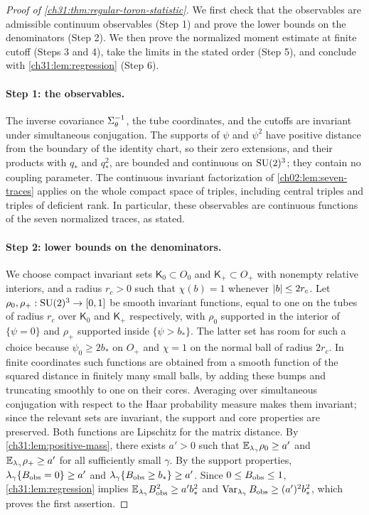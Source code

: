 \begin{proof}[Proof of \cref{ch31:thm:regular-toron-statistic}]
We first check that the observables are admissible continuum observables (Step 1) and prove the lower bounds on the denominators (Step 2). We then prove the normalized moment estimate at finite cutoff (Steps 3 and 4), take the limits in the stated order (Step 5), and conclude with \cref{ch31:lem:regression} (Step 6).

\paragraph{Step 1: the observables.}
The inverse covariance $\Sigma_\theta^{-1}$, the tube coordinates, and the cutoffs are invariant under simultaneous conjugation. The supports of $\psi$ and $\psi^2$ have positive distance from the boundary of the identity chart, so their zero extensions, and their products with $q_*$ and $q_*^2$, are bounded and continuous on $\mathrm{SU}(2)^3$; they contain no coupling parameter. The continuous invariant factorization of \cref{ch02:lem:seven-traces} applies on the whole compact space of triples, including central triples and triples of deficient rank. In particular, these observables are continuous functions of the seven normalized traces, as stated.

\paragraph{Step 2: lower bounds on the denominators.}
We choose compact invariant sets $\mathsf K_0\subset O_0$ and $\mathsf K_+\subset O_+$ with nonempty relative interiors, and a radius $r_c>0$ such that $\chi(b)=1$ whenever $\lvert b\rvert\le2r_c$. Let $\rho_0,\rho_+:\mathrm{SU}(2)^3\to[0,1]$ be smooth invariant functions, equal to one on the tubes of radius $r_c$ over $\mathsf K_0$ and $\mathsf K_+$ respectively, with $\rho_0$ supported in the interior of $\{\psi=0\}$ and $\rho_+$ supported inside $\{\psi>b_*\}$. The latter set has room for such a choice because $\psi_0\ge2b_*$ on $O_+$ and $\chi=1$ on the normal ball of radius $2r_c$. In finite coordinates such functions are obtained from a smooth function of the squared distance in finitely many small balls, by adding these bumps and truncating smoothly to one on their cores. Averaging over simultaneous conjugation with respect to the Haar probability measure makes them invariant; since the relevant sets are invariant, the support and core properties are preserved. Both functions are Lipschitz for the matrix distance. By \cref{ch31:lem:positive-mass}, there exists $a'>0$ such that $\mathbb E_{\lambda_\gamma}\rho_0\ge a'$ and $\mathbb E_{\lambda_\gamma}\rho_+\ge a'$ for all sufficiently small $\gamma$. By the support properties, $\lambda_\gamma\{B_{\mathrm{obs}}=0\}\ge a'$ and $\lambda_\gamma\{B_{\mathrm{obs}}\ge b_*\}\ge a'$. Since $0\le B_{\mathrm{obs}}\le1$, \cref{ch31:lem:regression} implies $\mathbb E_{\lambda_\gamma}B_{\mathrm{obs}}^2\ge a'b_*^2$ and $\operatorname{Var}_{\lambda_\gamma}B_{\mathrm{obs}}\ge(a')^2b_*^2$, which proves the first assertion.


\end{proof}

